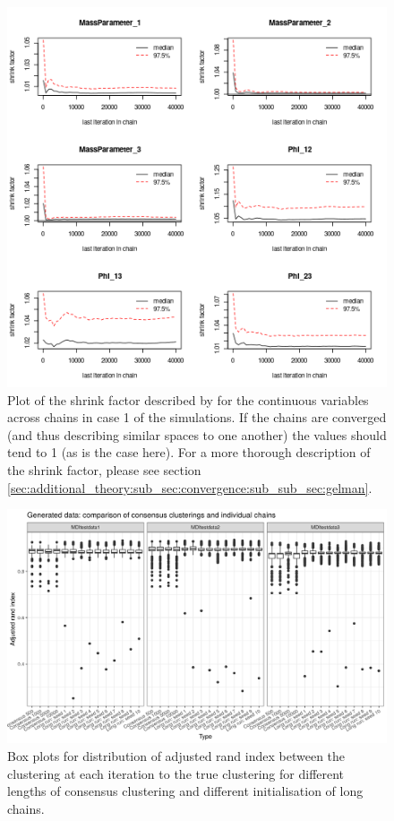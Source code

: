 \documentclass[12pt]{article} %
\begin{document}
	\begin{figure}[!htb]
			\centering
			\includegraphics[scale=0.65]{Images/Gen_data/Case_1/Gelman_plot.png}
			\caption{Plot of the shrink factor described by \citet{GelmanInferenceIterativeSimulation1992} for the continuous variables across chains in case 1 of the simulations. If the chains are converged (and thus describing similar spaces to one another) the values should tend to 1 (as is the case here). For a more thorough description of the shrink factor, please see section \ref{sec:additional_theory:sub_sec:convergence:sub_sub_sec:gelman}.}
			\label{fig:gen_data_case_1_gelman_plot}
		\end{figure}

	
		\begin{figure}
			\centering
			\includegraphics[scale=0.9]{Images/Gen_data/Case_1/box_plot_ari_true_clustering.png}
			\caption{Box plots for distribution of adjusted rand index between the clustering at each iteration to the true clustering for different lengths of consensus clustering and different initialisation of long chains.}
			\label{fig:gen_data_case_1_boxplot}
		\end{figure}
		
\end{document}
